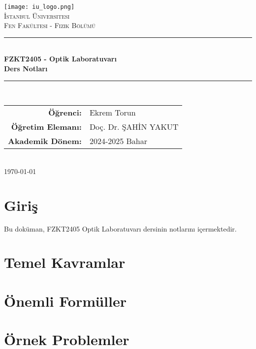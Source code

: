 \documentclass[12pt,a4paper]{article}
\begin{document}
\begin{titlepage}
    \centering
    \texttt{[image: iu\_logo.png]}\\[1cm]
    {\scshape\LARGE İstanbul Üniversitesi\\}
    {\scshape\Large Fen Fakültesi - Fizik Bölümü\\[0.5cm]}
    \rule{\linewidth}{0.2mm} \\[0.4cm]
    { \huge \bfseries FZKT2405 - Optik Laboratuvarı\\
    Ders Notları\\[0.4cm] }
    \rule{\linewidth}{0.2mm} \\[1.5cm]
    
    {\large
    \begin{tabular}{rl}
        \textbf{Öğrenci:} & Ekrem Torun \\
        \textbf{Öğretim Elemanı:} & Doç. Dr. ŞAHİN YAKUT \\
        \textbf{Akademik Dönem:} & 2024-2025 Bahar \\
    \end{tabular}}\\[2cm]
    
    {\large \today}
\end{titlepage}

\tableofcontents
\newpage

\section{Giriş}
Bu doküman, FZKT2405 Optik Laboratuvarı dersinin notlarını içermektedir.

\section{Temel Kavramlar}

\section{Önemli Formüller}

\section{Örnek Problemler}
\end{document}
